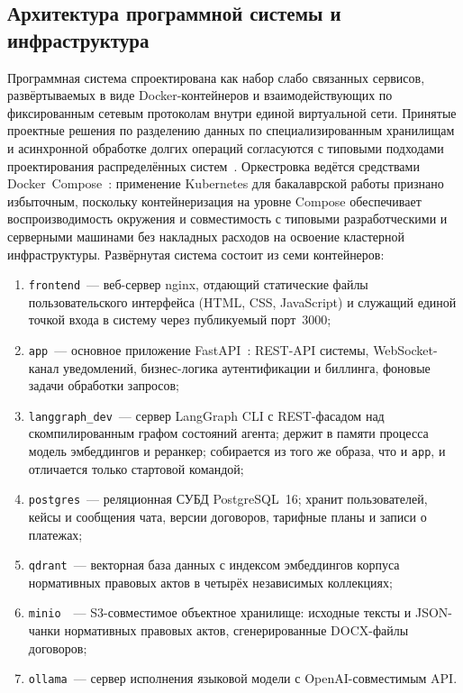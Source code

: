 \subsection{Архитектура программной системы и инфраструктура}

Программная система спроектирована как набор слабо связанных сервисов, развёртываемых в виде Docker-контейнеров и взаимодействующих по фиксированным сетевым протоколам внутри единой виртуальной сети. Принятые проектные решения по разделению данных по специализированным хранилищам и асинхронной обработке долгих операций согласуются с типовыми подходами проектирования распределённых систем~\cite{tanenbaum2023distributed}. Оркестровка ведётся средствами Docker~Compose~\cite{docker_compose_docs}: применение Kubernetes для бакалаврской работы признано избыточным, поскольку контейнеризация на уровне Compose обеспечивает воспроизводимость окружения и совместимость с типовыми разработческими и серверными машинами без накладных расходов на освоение кластерной инфраструктуры. Развёрнутая система состоит из семи контейнеров:

\begin{enumerate}
    \item \texttt{frontend}~--- веб-сервер nginx, отдающий статические файлы пользовательского интерфейса (HTML, CSS, JavaScript) и служащий единой точкой входа в систему через публикуемый порт~3000;
    \item \texttt{app}~--- основное приложение FastAPI~\cite{fastapi_docs}: REST-API системы, WebSocket-канал уведомлений, бизнес-логика аутентификации и биллинга, фоновые задачи обработки запросов;
    \item \texttt{langgraph\_dev}~--- сервер LangGraph CLI с REST-фасадом над скомпилированным графом состояний агента; держит в памяти процесса модель эмбеддингов и реранкер; собирается из того же образа, что и \texttt{app}, и отличается только стартовой командой;
    \item \texttt{postgres}~--- реляционная СУБД PostgreSQL~16; хранит пользователей, кейсы и сообщения чата, версии договоров, тарифные планы и записи о платежах;
    \item \texttt{qdrant}~--- векторная база данных с индексом эмбеддингов корпуса нормативных правовых актов в четырёх независимых коллекциях;
    \item \texttt{minio}~\cite{minio_docs}~--- S3-совместимое объектное хранилище: исходные тексты и JSON-чанки нормативных правовых актов, сгенерированные DOCX-файлы договоров;
    \item \texttt{ollama}~--- сервер исполнения языковой модели с OpenAI-совместимым API.
\end{enumerate}

